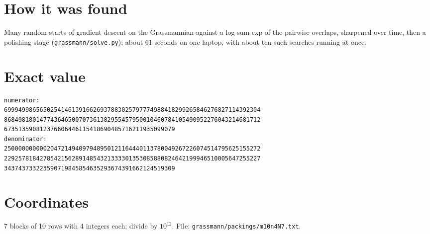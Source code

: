 \documentclass[11pt,a4paper]{article}
\begin{document}
\section{How it was found}
Many random starts of gradient descent on the Grassmannian against a log-sum-exp of the pairwise overlaps, sharpened over time, then a polishing stage (\texttt{grassmann/solve.py}); about 61 seconds on one laptop, with about ten such searches running at once.


\appendix
\section{Exact value}
{\small
\begin{verbatim}
numerator:
699949986565025414613916626937883025797774988418299265846276827114392304
868498180147743646500707361382955457950010460784105490952276043214681712
673513590812376606446115418690485716211935099079
denominator:
250000000000204721494097948950121164440113780049267226074514795625155272
229257818427854215628914854321333301353085880824642199946510005647255227
343743733223590719845854635293674391662124519309
\end{verbatim}}

\section{Coordinates}
7 blocks of 10 rows with 4 integers each; divide by $10^{12}$. File: \texttt{grassmann/packings/m10n4N7.txt}.
{\tiny
\begin{multicols}{3}
\end{multicols}}
\end{document}
